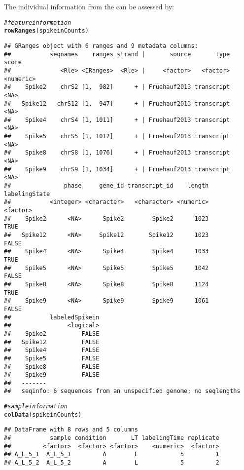 \documentclass{article}\usepackage[]{graphicx}\usepackage[usenames,dvipsnames]{color}
\makeatletter
\newcommand{\hlcom}[1]{\textcolor[rgb]{0.678,0.584,0.686}{\textit{#1}}}%
\newcommand{\hlstd}[1]{\textcolor[rgb]{0.345,0.345,0.345}{#1}}%
\newcommand{\hlkwd}[1]{\textcolor[rgb]{0.737,0.353,0.396}{\textbf{#1}}}%
\newenvironment{kframe}{%
 \def\at@end@of@kframe{}%
 \ifinner\ifhmode%
  \def\at@end@of@kframe{\end{minipage}}%
  \begin{minipage}{\columnwidth}%
 \fi\fi%
 \def\FrameCommand##1{\hskip\@totalleftmargin \hskip-\fboxsep
 \colorbox{shadecolor}{##1}\hskip-\fboxsep
     \hskip-\linewidth \hskip-\@totalleftmargin \hskip\columnwidth}%
 \MakeFramed {\advance\hsize-\width
   \@totalleftmargin\z@ \linewidth\hsize
   \@setminipage}}%
 {\par\unskip\endMakeFramed%
 \at@end@of@kframe}
\newenvironment{knitrout}{}{} %
\makeatother
\begin{document}
The individual information from the  can be assessed by:
\begin{knitrout}
\color{fgcolor}\begin{kframe}
\begin{alltt}
\hlcom{# feature information}
\hlkwd{rowRanges}\hlstd{(spikeinCounts)}
\end{alltt}
\begin{verbatim}
## GRanges object with 6 ranges and 9 metadata columns:
##           seqnames    ranges strand |       source       type     score
##              <Rle> <IRanges>  <Rle> |     <factor>   <factor> <numeric>
##    Spike2    chrS2 [1,  982]      + | Fruehauf2013 transcript      <NA>
##   Spike12   chrS12 [1,  947]      + | Fruehauf2013 transcript      <NA>
##    Spike4    chrS4 [1, 1011]      + | Fruehauf2013 transcript      <NA>
##    Spike5    chrS5 [1, 1012]      + | Fruehauf2013 transcript      <NA>
##    Spike8    chrS8 [1, 1076]      + | Fruehauf2013 transcript      <NA>
##    Spike9    chrS9 [1, 1034]      + | Fruehauf2013 transcript      <NA>
##               phase     gene_id transcript_id    length labelingState
##           <integer> <character>   <character> <numeric>      <factor>
##    Spike2      <NA>      Spike2        Spike2      1023          TRUE
##   Spike12      <NA>     Spike12       Spike12      1023         FALSE
##    Spike4      <NA>      Spike4        Spike4      1033          TRUE
##    Spike5      <NA>      Spike5        Spike5      1042         FALSE
##    Spike8      <NA>      Spike8        Spike8      1124          TRUE
##    Spike9      <NA>      Spike9        Spike9      1061         FALSE
##           labeledSpikein
##                <logical>
##    Spike2          FALSE
##   Spike12          FALSE
##    Spike4          FALSE
##    Spike5          FALSE
##    Spike8          FALSE
##    Spike9          FALSE
##   -------
##   seqinfo: 6 sequences from an unspecified genome; no seqlengths
\end{verbatim}
\begin{alltt}
\hlcom{# sample information}
\hlkwd{colData}\hlstd{(spikeinCounts)}
\end{alltt}
\begin{verbatim}
## DataFrame with 8 rows and 5 columns
##           sample condition       LT labelingTime replicate
##         <factor>  <factor> <factor>    <numeric>  <factor>
## A_L_5_1  A_L_5_1         A        L            5         1
## A_L_5_2  A_L_5_2         A        L            5         2

\end{verbatim}
\end{kframe}
\end{knitrout}
\end{document}
